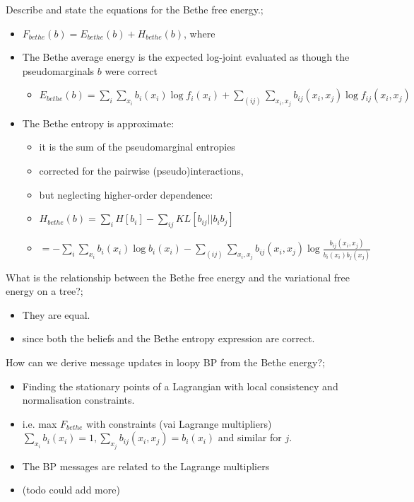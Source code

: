 \documentclass{article}
\begin{document}
Describe and state the equations for the Bethe free energy.; \begin{itemize}
    \item $F_{bethe}(b) = E_{bethe}(b) + H_{bethe}(b)$, where
    \item The Bethe average energy is the expected log-joint evaluated as though the pseudomarginals $b$ were correct \begin{itemize}
        \item $E_{bethe}(b) = \sum_i \sum_{x_i} b_i(x_i)\log f_i(x_i) + \sum_{(ij)}\sum_{x_i, x_j} b_{ij}(x_i, x_j)\log f_{ij}(x_i, x_j)$
    \end{itemize} 
    \item The Bethe entropy is approximate: \begin{itemize}
        \item it is the sum of the pseudomarginal entropies \item corrected for the pairwise (pseudo)interactions, \item but neglecting higher-order dependence:
        \item $H_{bethe}(b) = \sum_i H[b_i] - \sum_{ij}KL[b_{ij}||b_ib_j]$
        \item $=-\sum_i \sum_{x_i}b_i(x_i)\log b_i(x_i) - \sum_{(ij)}\sum_{x_i, x_j}b_{ij}(x_i, x_j)\log \frac{b_{ij}(x_i, x_j)}{b_i(x_i)b_j(x_j)}$
    \end{itemize} 
\end{itemize}

What is the relationship between the Bethe free energy and the variational free energy on a tree?; \begin{itemize}
    \item They are equal.
    \item since both the beliefs and the Bethe entropy expression are correct.
\end{itemize}

How can we derive message updates in loopy BP from the Bethe energy?; \begin{itemize}
    \item Finding the stationary points of a Lagrangian with local consistency and normalisation constraints.
    \item i.e. max $F_{bethe}$ with constraints (vai Lagrange multipliers) $\sum_{x_i}b_i(x_i) = 1, \sum_{x_j}b_{ij}(x_i, x_j) = b_i(x_i)$ and similar for $j$.
    \item The BP messages are related to the Lagrange multipliers
    \item (todo could add more)
\end{itemize}
\end{document}
